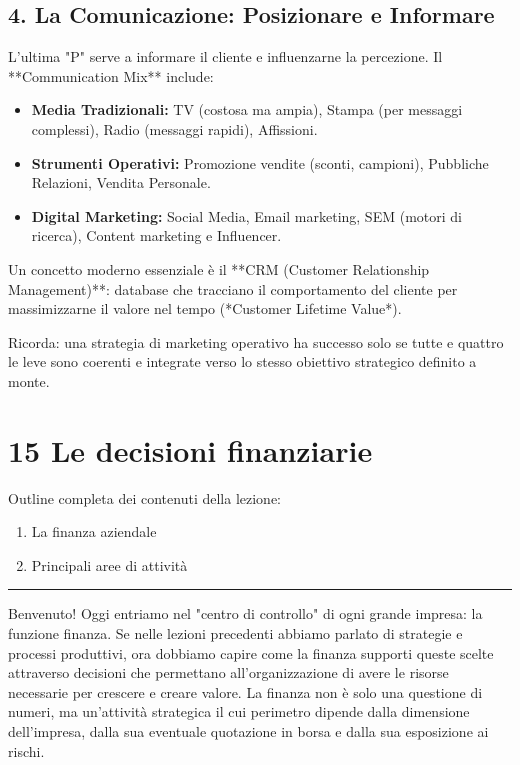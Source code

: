 \documentclass[a4paper,10pt]{article}
\begin{document}
\subsection*{4. La Comunicazione: Posizionare e Informare}

L'ultima "P" serve a informare il cliente e influenzarne la percezione. Il **Communication Mix** include:
\begin{itemize}
    \item \textbf{Media Tradizionali:} TV (costosa ma ampia), Stampa (per messaggi complessi), Radio (messaggi rapidi), Affissioni.
    \item \textbf{Strumenti Operativi:} Promozione vendite (sconti, campioni), Pubbliche Relazioni, Vendita Personale.
    \item \textbf{Digital Marketing:} Social Media, Email marketing, SEM (motori di ricerca), Content marketing e Influencer.
\end{itemize}
Un concetto moderno essenziale è il **CRM (Customer Relationship Management)**: database che tracciano il comportamento del cliente per massimizzarne il valore nel tempo (*Customer Lifetime Value*).

Ricorda: una strategia di marketing operativo ha successo solo se tutte e quattro le leve sono coerenti e integrate verso lo stesso obiettivo strategico definito a monte.
\section*{15 Le decisioni finanziarie}

Outline completa dei contenuti della lezione:
{\small
\begin{enumerate}
\item La finanza aziendale
\item Principali aree di attività
\end{enumerate}
}
\hrule
\vspace{0.5cm}

Benvenuto! Oggi entriamo nel "centro di controllo" di ogni grande impresa: la funzione finanza. Se nelle lezioni precedenti abbiamo parlato di strategie e processi produttivi, ora dobbiamo capire come la finanza supporti queste scelte attraverso decisioni che permettano all'organizzazione di avere le risorse necessarie per crescere e creare valore. La finanza non è solo una questione di numeri, ma un'attività strategica il cui perimetro dipende dalla dimensione dell'impresa, dalla sua eventuale quotazione in borsa e dalla sua esposizione ai rischi.
\end{document}
